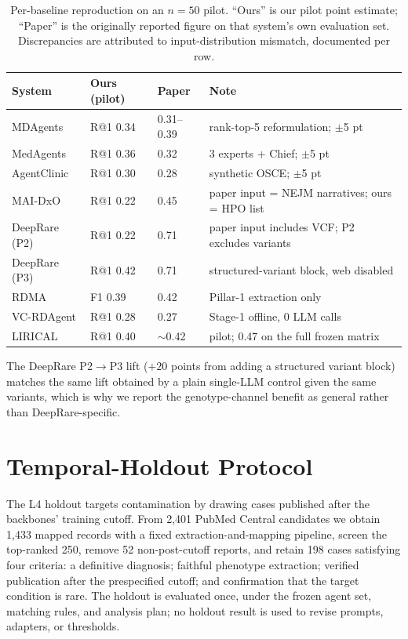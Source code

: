 \documentclass[letterpaper]{article} %
\begin{document}
\begin{table}[t]
\centering
\scriptsize
\setlength{\tabcolsep}{4pt}
\caption{Per-baseline reproduction on an $n{=}50$ pilot. ``Ours'' is our pilot
point estimate; ``Paper'' is the originally reported figure on that system's own
evaluation set. Discrepancies are attributed to input-distribution mismatch,
documented per row.}
\label{tab:repro}
\begin{tabular}{@{}llll@{}}
\toprule
System & Ours (pilot) & Paper & Note \\
\midrule
MDAgents & R@1 0.34 & 0.31--0.39 & rank-top-5 reformulation; $\pm$5 pt \\
MedAgents & R@1 0.36 & 0.32 & 3 experts + Chief; $\pm$5 pt \\
AgentClinic & R@1 0.30 & 0.28 & synthetic OSCE; $\pm$5 pt \\
MAI-DxO & R@1 0.22 & 0.45 & paper input = NEJM narratives; ours = HPO list \\
DeepRare (P2) & R@1 0.22 & 0.71 & paper input includes VCF; P2 excludes variants \\
DeepRare (P3) & R@1 0.42 & 0.71 & structured-variant block, web disabled \\
RDMA & F1 0.39 & 0.42 & Pillar-1 extraction only \\
VC-RDAgent & R@1 0.28 & 0.27 & Stage-1 offline, 0 LLM calls \\
LIRICAL & R@1 0.40 & $\sim$0.42 & pilot; 0.47 on the full frozen matrix \\
\bottomrule
\end{tabular}
\end{table}

The DeepRare P2$\rightarrow$P3 lift ($+20$ points from adding a structured
variant block) matches the same lift obtained by a plain single-LLM control
given the same variants, which is why we report the genotype-channel benefit as
general rather than DeepRare-specific.

\section{Temporal-Holdout Protocol}
\label{app:holdout}

The L4 holdout targets contamination by drawing cases published after the
backbones' training cutoff. From 2,401 PubMed Central candidates we obtain 1,433
mapped records with a fixed extraction-and-mapping pipeline, screen the
top-ranked 250, remove 52 non-post-cutoff reports, and retain 198 cases
satisfying four criteria: a definitive diagnosis; faithful phenotype extraction;
verified publication after the prespecified cutoff; and confirmation that the
target condition is rare. The holdout is evaluated once, under the frozen agent
set, matching rules, and analysis plan; no holdout result is used to revise
prompts, adapters, or thresholds.
\end{document}

